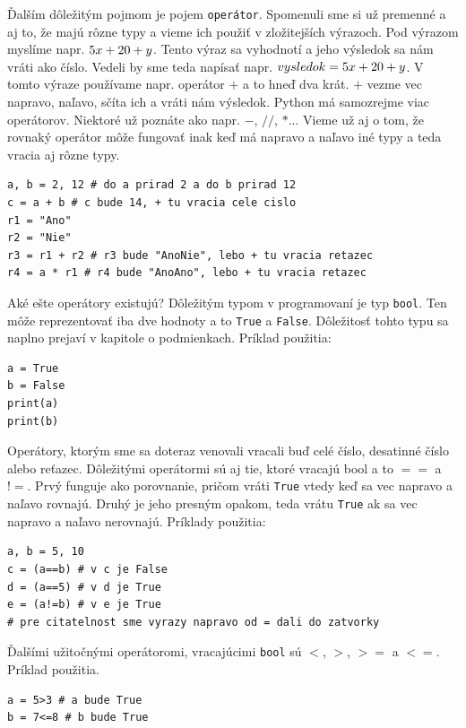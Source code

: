 \documentclass{article}
\begin{document}
Ďalším dôležitým pojmom je pojem \texttt{operátor}. Spomenuli sme si už premenné a aj to, že majú rôzne typy a vieme ich použiť v zložitejších výrazoch. Pod výrazom myslíme napr. $5\*x + 20 + y$. Tento výraz sa vyhodnotí a jeho výsledok sa nám vráti ako číslo. Vedeli by sme teda napísať napr. $vysledok = 5\*x + 20 + y$. V tomto výraze používame napr. operátor $+$ a to hneď dva krát. $+$ vezme vec napravo, naľavo, sčíta ich a vráti nám výsledok. Python má samozrejme viac operátorov. Niektoré už poznáte ako napr. $-$, $//$, $*$... Vieme už aj o tom, že rovnaký operátor môže fungovať inak keď má napravo a naľavo iné typy a teda vracia aj rôzne typy.

\begin{lstlisting}
a, b = 2, 12 # do a prirad 2 a do b prirad 12
c = a + b # c bude 14, + tu vracia cele cislo
r1 = "Ano"
r2 = "Nie"
r3 = r1 + r2 # r3 bude "AnoNie", lebo + tu vracia retazec
r4 = a * r1 # r4 bude "AnoAno", lebo + tu vracia retazec
\end{lstlisting}

Aké ešte operátory existujú? Dôležitým typom v programovaní je typ \texttt{bool}. Ten môže reprezentovať iba dve hodnoty a to \texttt{True} a \texttt{False}. Dôležitosť tohto typu sa naplno prejaví v kapitole o podmienkach. Príklad použitia:

\begin{lstlisting}
a = True
b = False
print(a)
print(b)
\end{lstlisting}

Operátory, ktorým sme sa doteraz venovali vracali buď celé číslo, desatinné číslo alebo reťazec. Dôležitými operátormi sú aj tie, ktoré vracajú bool a to $==$ a $!=$. Prvý funguje ako porovnanie, pričom vráti \texttt{True} vtedy keď sa vec napravo a naľavo rovnajú. Druhý je jeho presným opakom, teda  vrátu \texttt{True} ak sa vec napravo a naľavo nerovnajú. Príklady použitia:

\begin{lstlisting}
a, b = 5, 10
c = (a==b) # v c je False
d = (a==5) # v d je True
e = (a!=b) # v e je True
# pre citatelnost sme vyrazy napravo od = dali do zatvorky
\end{lstlisting}

Ďalšími užitočnými operátoromi, vracajúcimi \texttt{bool} sú $<$, $>$, $>=$ a $<=$. Príklad použitia.

\begin{lstlisting}
a = 5>3 # a bude True
b = 7<=8 # b bude True
\end{lstlisting}
\end{document}

